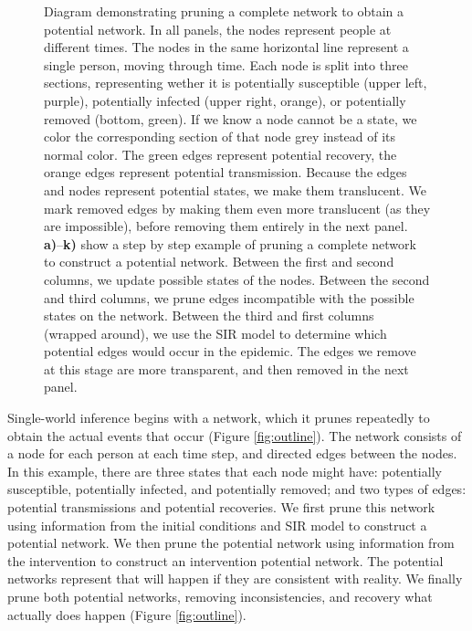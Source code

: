 \documentclass[PTRSB]{rsos}
\begin{document}
\begin{figure}[hp]
\caption{Diagram demonstrating pruning a complete network to obtain a potential network.  In all panels, the nodes represent people at different times.  The nodes in the same horizontal line represent a single person, moving through time.  Each node is split into three sections, representing wether it is potentially susceptible (upper left, purple), potentially infected (upper right, orange), or potentially removed (bottom, green).  If we know a node cannot be a state, we color the corresponding section of that node grey instead of its normal color.  The green edges represent potential recovery, the orange edges represent potential transmission.  Because the edges and nodes represent potential states, we make them translucent.  We mark removed edges by making them even more translucent (as they are impossible), before removing them entirely in the next panel.  \textbf{a)}--\textbf{k)} show a step by step example of pruning a complete network to construct a potential network.  Between the first and second columns, we update possible states of the nodes.  Between the second and third columns, we prune edges incompatible with the possible states on the network.  Between the third and first columns (wrapped around), we use the SIR model to determine which potential edges would occur in the epidemic.  The edges we remove at this stage are more transparent, and then removed in the next panel.}
\label{fig:pruning}
\end{figure}

Single-world inference begins with a network, which it prunes repeatedly to obtain the actual events that occur (Figure \ref{fig:outline}).
The network consists of a node for each person at each time step, and directed edges between the nodes.
In this example, there are three states that each node might have: potentially susceptible, potentially infected, and potentially removed; and two types of edges: potential transmissions and potential recoveries.
We first prune this network using information from the initial conditions and SIR model to construct a potential network.
We then prune the potential network using information from the intervention to construct an intervention potential network.
The potential networks represent that will happen if they are consistent with reality.
We finally prune both potential networks, removing inconsistencies, and recovery what actually does happen (Figure \ref{fig:outline}).
\end{document}
